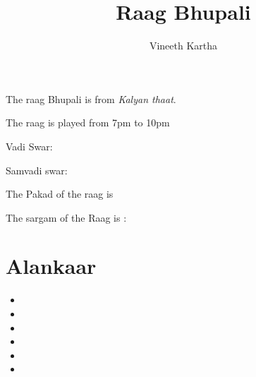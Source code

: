 \documentclass{hindustani}
\begin{document}
\title{Raag Bhupali}
\author{Vineeth Kartha}
\date{}
\maketitle

The raag Bhupali is from \textit{Kalyan thaat}.

The raag is played from 7pm to 10pm

Vadi Swar: \Ga  

Samvadi swar: \Dha


The Pakad of the raag is   

The sargam of the Raag is :

\aaroha{\sa\Ri\Ga\pa\Dha\hsa}

\avaroha{\hsa\Dha\pa\Ga\Ri\sa}


\section{Alankaar}
\begin{itemize}

\item \alankar{{\sa\Ri\Ga} {\Ri\Ga\pa} {\Ga\pa\Dha} {\pa\Dha\hsa}}{{\hsa\Dha\pa} {\Dha\pa\Ga} {\pa\Ga\Ri} {\Ga\Ri\sa}}

\item \alankar{{\sa\Ri\Ga\pa} {\Ri\Ga\pa\Dha} {\Ga\pa\Dha\hsa}}{{\hsa\Dha\pa\Ga} {\Dha\pa\Ga\Ri} {\pa\Ga\Ri\sa}}

\item \alankar{{\sa\Ri\Ga\pa\Dha} {\Ri\Ga\pa\Dha\hsa}}{{\hsa\Dha\pa\Ga\Ri} {\Dha\pa\Ga\Ri\sa}}

\item \alankar{{\sa\Ri\Ga\pa} {\Ri\Ga\pa\Dha} {\Ga\pa\Dha\hsa}}{{\hsa\Dha\pa\Ga} {\Dha\pa\Ga\Ri} {\pa\Ga\Ri\sa}}

\item \alankar{{\sa\Ga} {\Ri\pa} {\Ga\Dha} {\pa\hsa}}{{\hsa\pa} {\Dha\Ga} {\pa\Ri} {\Ga\sa}}

\item \alankar{{\sa\Ga\Ri} {\Ri\pa\Ga} {\Ga\Dha\pa} {\pa\hsa\Dha}}{{\hsa\pa\Dha} {\Dha\Ga\pa} {\pa\Ri\Ga} {\Ga\sa\Ri}}

\end{itemize}

\matra{\sa \Ri}

\kan{\Dha}{\pa}
\end{document}
